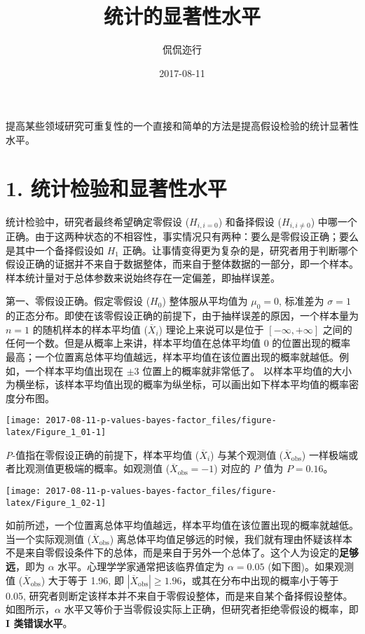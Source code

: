\documentclass[]{article}
\title{统计的显著性水平}
\author{侃侃迩行}
\date{2017-08-11}
\begin{document}
\maketitle

提高某些领域研究可重复性的一个直接和简单的方法是提高假设检验的统计显著性水平。

\hypertarget{hypothesis-testing}{%
\section{1. 统计检验和显著性水平}\label{hypothesis-testing}}

统计检验中，研究者最终希望确定零假设 (\(H_{i,i=0}\)) 和备择假设
(\(H_{i, i \neq 0}\))
中哪一个正确。由于这两种状态的不相容性，事实情况只有两种：要么是零假设正确；要么是其中一个备择假设如
\(H_1\)
正确。让事情变得更为复杂的是，研究者用于判断哪个假设正确的证据并不来自于数据整体，而来自于整体数据的一部分，即一个样本。样本统计量对于总体参数来说始终存在一定偏差，即抽样误差。

第一、零假设正确。假定零假设 (\(H_0\)) 整体服从平均值为 \(\mu_0 = 0\),
标准差为 \(\sigma = 1\)
的正态分布。即使在该零假设正确的前提下，由于抽样误差的原因，一个样本量为
\(n=1\) 的随机样本的样本平均值 (\(\overline{X}_i\)) 理论上来说可以是位于
\([-\infty, +\infty]\)
之间的任何一个数。但是从概率上来讲，样本平均值在总体平均值 0
的位置出现的概率最高；一个位置离总体平均值越远，样本平均值在该位置出现的概率就越低。例如，一个样本平均值出现在
\(\pm 3\) 位置上的概率就非常低了。
以样本平均值的大小为横坐标，该样本平均值出现的概率为纵坐标，可以画出如下样本平均值的概率密度分布图。

\begin{center}\texttt{[image: 2017-08-11-p-values-bayes-factor\_files/figure-latex/Figure\_1\_01-1]} \end{center}

\emph{P}-值指在零假设正确的前提下，样本平均值 (\(\overline{X}_i\))
与某个观测值 (\(\overline{X}_\text{obs}\))
一样极端或者比观测值更极端的概率。如观测值
(\(\overline{X}_\text{obs} = -1\)) 对应的 \emph{P} 值为 \(P=0.16\)。

\begin{center}\texttt{[image: 2017-08-11-p-values-bayes-factor\_files/figure-latex/Figure\_1\_02-1]} \end{center}

如前所述，一个位置离总体平均值越远，样本平均值在该位置出现的概率就越低。当一个实际观测值
(\(\overline{X}_\text{obs}\))
离总体平均值足够远的时候，我们就有理由怀疑该样本不是来自零假设条件下的总体，而是来自于另外一个总体了。这个人为设定的\textbf{足够远}，即为
\(\alpha\) 水平。心理学学家通常把该临界值定为 \(\alpha=0.05\)
(如下图)。如果观测值 (\(\overline{X}_\text{obs}\)) 大于等于 1.96, 即
\(|\overline{X}_\text{obs}|\geq 1.96\)，或其在分布中出现的概率小于等于
0.05,
研究者则断定该样本并不来自于零假设整体，而是来自某个备择假设整体。如图所示，\(\alpha\)
水平又等价于当零假设实际上正确，但研究者拒绝零假设的概率，即 \textbf{I
类错误水平}。
\end{document}
